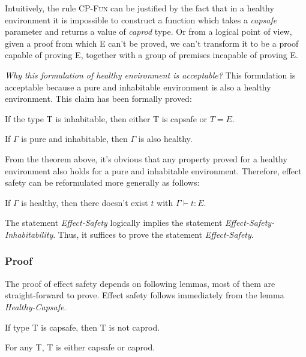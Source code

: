 Intuitively, the rule \textsc{CP-Fun} can be justified by the fact
that in a healthy environment it is impossible to construct a function
which takes a \emph{capsafe} parameter and returns a value of
\emph{caprod} type. Or from a logical point of view, given a proof
from which E can't be proved, we can't transform it to be a proof
capable of proving E, together with a group of premises incapable of
proving E.

\emph{Why this formulation of healthy environment is acceptable?} This
formulation is acceptable because a pure and inhabitable environment
is also a healthy environment. This claim has been formally proved:

\begin{lemma}
  If the type T is inhabitable, then either T is capsafe or $T = E$.
\end{lemma}

\begin{theorem}
  If $\Gamma$ is pure and inhabitable, then $\Gamma$ is also healthy.
\end{theorem}

From the theorem above, it's obvious that any property proved for a
healthy environment also holds for a pure and inhabitable
environment. Therefore, effect safety can be reformulated more
generally as follows:

\begin{definition}
  If $\Gamma$ is healthy, then there doesn't exist $t$ with
  $\Gamma \vdash t : E$.
\end{definition}

The statement \emph{Effect-Safety} logically implies the statement
\emph{Effect-Safety-Inhabitability}. Thus, it suffices to prove the
statement \emph{Effect-Safety}.

\subsubsection{Proof}

The proof of effect safety depends on following lemmas, most of them
are straight-forward to prove. Effect safety follows immediately from
the lemma \emph{Healthy-Capsafe}.


\begin{lemma}
 If type T is capsafe, then T is not caprod.
\end{lemma}

\begin{lemma}
 For any T, T is either capsafe or caprod.
\end{lemma}

